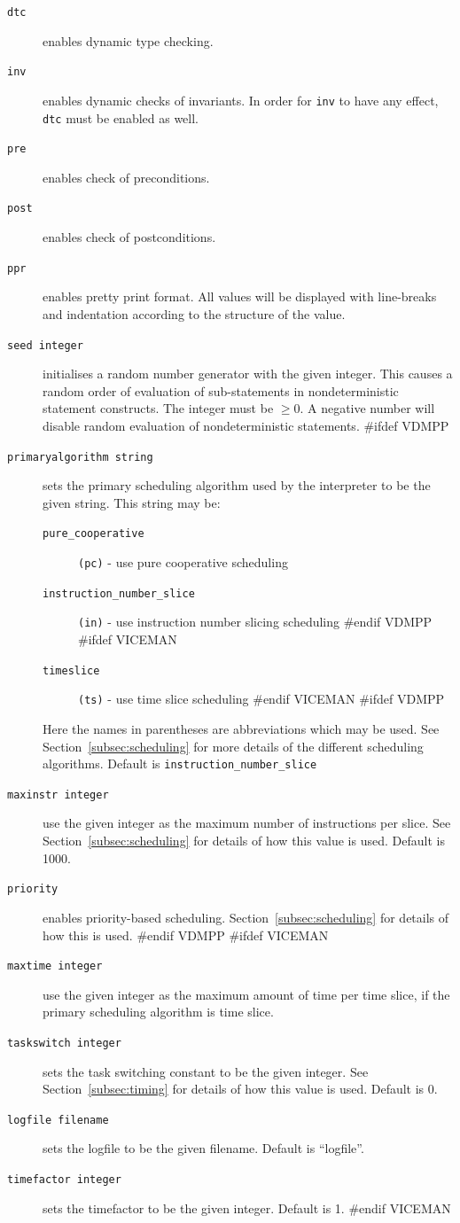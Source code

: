 \documentclass[\pformat,12pt]{article}
\begin{document}
\begin{description}
  \begin{description}
  \item[{\tt dtc}] enables dynamic type checking.
  \item[{\tt inv}] enables dynamic checks of invariants. In order for
    {\tt inv} to have any effect, {\tt dtc} must be enabled as well.
  \item[{\tt pre}] enables check of preconditions.
  \item[{\tt post}] enables check of postconditions.
  \item[{\tt ppr}] enables pretty print format. All values will be
    displayed with line-breaks and indentation according to the
    structure of the value.
  \item[{\tt seed integer}] initialises a random number generator with
    the given integer.  This causes a random order of evaluation of
    sub-statements in nondeterministic statement constructs.  The
    integer must be $\geq 0$. A negative number will disable random
    evaluation of nondeterministic statements.
#ifdef VDMPP
  \item[{\tt primaryalgorithm string}] sets the primary scheduling
    algorithm used by the interpreter to be the given string. This
    string may be:
    \begin{description}
    \item[{\tt pure\_cooperative}] \texttt{(pc)} - use pure cooperative scheduling
    \item[{\tt instruction\_number\_slice}] \texttt{(in)} - use instruction number slicing scheduling
#endif VDMPP
#ifdef VICEMAN
    \item[{\tt timeslice}] \texttt{(ts)} - use time slice scheduling 
#endif VICEMAN
#ifdef VDMPP
    \end{description}
    Here the names in parentheses are abbreviations which may be
    used. See Section~\ref{subsec:scheduling} for more details of the
    different scheduling algorithms. Default is 
    {\tt instruction\_number\_slice}
  \item[{\tt maxinstr integer}] use the given integer as the maximum
    number of instructions per slice. See
    Section~\ref{subsec:scheduling} for details of how this value is
    used. Default is 1000.
  \item[{\tt priority}] enables priority-based scheduling.
    Section~\ref{subsec:scheduling} for details of how this is
    used. 
#endif VDMPP
#ifdef VICEMAN
  \item[{\tt maxtime integer}] use the given integer as the maximum
    amount of time per time slice, if the primary scheduling algorithm
    is time slice.
  \item[{\tt taskswitch integer}] sets the task switching constant to
    be the given integer. See Section~\ref{subsec:timing} for details
    of how this value is used. Default is 0.
  \item[{\tt logfile filename}] sets the logfile to be the given
    filename. Default is ``logfile''.
  \item[{\tt timefactor integer}] sets the timefactor to be the given
    integer. Default is 1.
#endif VICEMAN
  \end{description}
  

\end{description}
\end{document}
